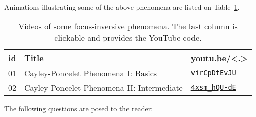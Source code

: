 Animations illustrating some of the above phenomena are listed on Table~\ref{tab:playlist}.

\begin{table}
\small
\begin{tabular}{|c|l|l|}
\hline
id & Title & \textbf{youtu.be/<.>}\\
\hline
01 & {Cayley-Poncelet Phenomena I: Basics} &
\href{https://youtu.be/virCpDtEvJU}{\texttt{virCpDtEvJU}}\\
02 & {Cayley-Poncelet Phenomena II: Intermediate} &
\href{https://youtu.be/4xsm\_hQU-dE}{\texttt{4xsm\_hQU-dE}}\\
\hline
\end{tabular}
\caption{Videos of some focus-inversive phenomena. The last column is clickable and provides the YouTube code.}
\label{tab:playlist}
\end{table}

The following questions are posed to the reader:

